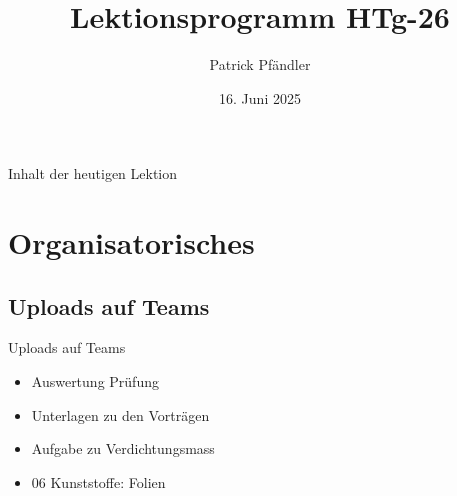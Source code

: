 



\title{\textbf{Lektionsprogramm HTg-26}}
\author{Patrick Pfändler}
\date{16. Juni   2025}




\frame{\titlepage}





\begin{frame}{Inhalt der heutigen Lektion}
    \tableofcontents
\end{frame}


\section{Organisatorisches}
\BlueSectionSlide

\subsection{Uploads auf Teams}
\begin{frame}{Uploads auf Teams}
    \begin{itemize}
        \item[\textbullet] Auswertung Prüfung
        \item[\textbullet] Unterlagen zu den Vorträgen
        \item[\textbullet] Aufgabe zu Verdichtungsmass
        \item[\textbullet] 06 Kunststoffe: Folien
    \end{itemize}

\end{frame}


